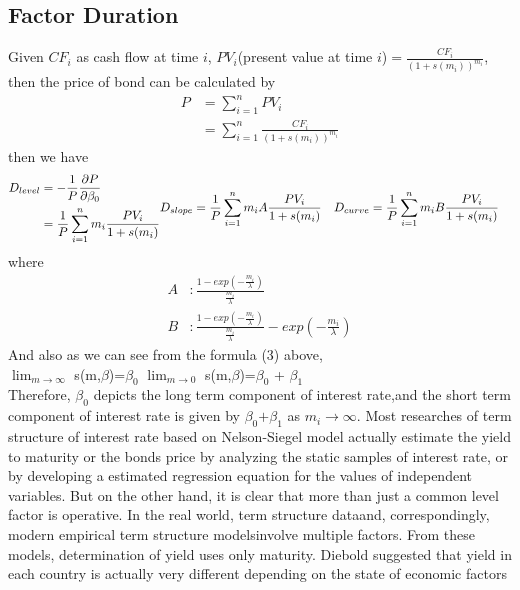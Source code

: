 \documentclass{article}
\begin{document}
\begin{spacing}{1.5}
\subsection{Factor Duration}
Given $CF_i$ as cash flow at time $i$, $PV_i$(present value at time $i$)$= \frac {CF_i}{(1+s(m_i))^{m_i}}$, then the price of bond can be calculated by
\begin{equation*}
\begin{split}
   P &=\sum_{i=1}^n PV_i \\
   &= \sum_{i=1}^n \frac{CF_i}{(1+s(m_i))^{m_i}}
\end{split}
\end{equation*}
then we have
\begin{equation*}
\begin{split}
D_{level} &=-\frac{1}{P} \frac{\partial P}{\partial \beta_0}\\
        &=\frac{1}{P} \sum_{i=1}^n m_i \frac{PV_i}{1+s(m_i)}
\end{split}\\
\begin{split}
D_{slope} &=\frac{1}{P} \sum_{i=1}^n m_iA \frac{PV_i}{1+s(m_i)}
\end{split}\\
\begin{split}
D_{curve} &=\frac{1}{P} \sum_{i=1}^n m_iB \frac{PV_i}{1+s(m_i)}
\end{split}
\end{equation*}
where
\begin{equation*}
\begin{split}
A&:\frac{1-exp(-\frac{m_i}{\lambda})}{\frac{m_i}{\lambda}}\\
B&:\frac{1-exp(-\frac{m_i}{\lambda})}{\frac{m_i}{\lambda}}-exp(-\frac{m_i}{\lambda})
\end{split}
\end{equation*}
 And also as we can see from the formula (3) above,\\

$\displaystyle\lim_{m\to \infty}$ s(m,\mbox{\boldmath $\beta$})=$\beta_0$\qquad 
$\displaystyle\lim_{m\to 0}$ s(m,\mbox{\boldmath $\beta$})=$\beta_0$ + $\beta_1$ \\

 Therefore, $\beta_0$ depicts the long term component of interest rate,and the short term component of interest rate is given by $\beta_0$$+$$\beta_1$ as ${m_i\to \infty}$.
 Most researches of term structure of interest rate based on Nelson-Siegel model actually estimate the yield to maturity or the bonds price by analyzing the static samples of interest rate, or by developing a estimated regression equation for the values of independent variables. But on the other hand, it is clear that more than just a common level factor is operative. In the real world, term structure data\textemdash and, correspondingly, modern empirical term structure models\textemdash involve multiple factors.
  From these models, determination of yield uses only maturity. Diebold suggested that yield in each country is actually very different depending on the state of economic factors


\end{spacing}
\end{document}
